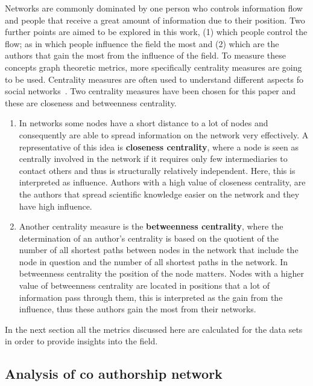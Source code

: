 \documentclass{article}
\theoremstyle{definition}
\begin{document}
Networks are commonly dominated by one person who controls information flow and
people that receive a great amount of information due to their position.
Two further points are aimed to be explored in this work, (1) which people control the flow;
as in which people influence the field the most and (2) which are the authors that
gain the most from the influence of the field. To measure these concepts graph
theoretic metrics, more specifically centrality measures are going to be used.
Centrality measures are often used to understand different
aspects fo social networks~\cite{Landherr2010}. Two centrality measures have been
chosen for this paper and these are closeness and betweenness centrality.

\begin{enumerate}
    \item In networks some nodes have a short distance to a lot of nodes and
    consequently are able to spread information on the network very effectively.
    A representative of this idea is \textbf{closeness centrality}, where a node
    is seen as centrally involved in the network if it requires only few
    intermediaries to contact others and thus is structurally relatively
    independent. Here, this is interpreted as influence. Authors with a high
    value of closeness centrality, are the authors that spread scientific
    knowledge easier on the network and they have high influence.
    \item Another centrality measure is the \textbf{betweenness centrality},
    where the determination of an author's centrality is based on the quotient
    of the number of all shortest paths between nodes in the network that
    include the node in question and the number of all shortest paths in the
    network. In betweenness centrality the position of the node matters. Nodes
    with a higher value of betweenness centrality are located in positions that
    a lot of information pass through them, this is interpreted as the gain from
    the influence, thus these authors gain the most from their networks.
\end{enumerate}

In the next section all the metrics discussed here are calculated for the data
sets in order to provide insights into the field.

\subsection{Analysis of co authorship network}\label{section:results}
\end{document}
